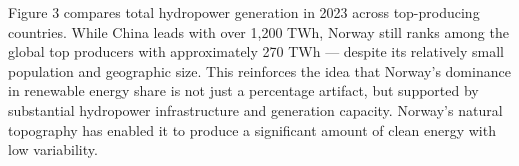 \documentclass[
  letterpaper,
  DIV=11,
  numbers=noendperiod]{scrartcl}
\begin{document}
Figure 3 compares total hydropower generation in 2023 across
top-producing countries. While China leads with over 1,200 TWh, Norway
still ranks among the global top producers with approximately 270 TWh
--- despite its relatively small population and geographic size. This
reinforces the idea that Norway's dominance in renewable energy share is
not just a percentage artifact, but supported by substantial hydropower
infrastructure and generation capacity. Norway's natural topography has
enabled it to produce a significant amount of clean energy with low
variability.
\end{document}
